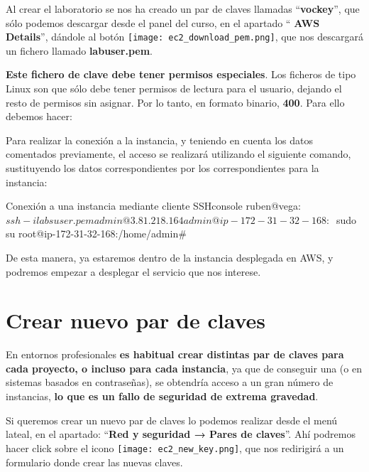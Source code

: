Al crear el laboratorio se nos ha creado un par de claves llamadas “\textbf{vockey}”, que sólo podemos descargar desde el panel del curso, en el apartado “\faInfo  \textbf{ AWS Details}”, dándole al botón \texttt{[image: ec2\_download\_pem.png]}, que nos descargará un fichero llamado \textbf{labuser.pem}.

\textbf{Este fichero de clave debe tener permisos especiales}. Los ficheros de tipo Linux son que sólo debe tener permisos de lectura para el usuario, dejando el resto de permisos sin asignar. Por lo tanto, en formato binario, \textbf{400}. Para ello debemos hacer:


Para realizar la conexión a la instancia, y teniendo en cuenta los datos comentados previamente, el acceso se realizará utilizando el siguiente comando, sustituyendo los datos correspondientes por los correspondientes para la instancia:

\begin{mycode}{Conexión a una instancia mediante cliente SSH}{console}{}
ruben@vega:~$ ssh -i labsuser.pem admin@3.81.218.164
admin@ip-172-31-32-168:~$ sudo su
root@ip-172-31-32-168:/home/admin#
\end{mycode}

De esta manera, ya estaremos dentro de la instancia desplegada en AWS, y podremos empezar a desplegar el servicio que nos interese.


\section{Crear nuevo par de claves}
En entornos profesionales \textbf{es habitual crear distintas par de claves para cada proyecto, o incluso para cada instancia}, ya que de conseguir una (o en sistemas basados en contraseñas), se obtendría acceso a un gran número de instancias, \textbf{lo que es un fallo de seguridad de extrema gravedad}.


Si queremos crear un nuevo par de claves lo podemos realizar desde el menú lateal, en el apartado: “\textbf{Red y seguridad → Pares de claves}”. Ahí podremos hacer click sobre el icono \texttt{[image: ec2\_new\_key.png]}, que nos redirigirá a un formulario donde crear las nuevas claves.

